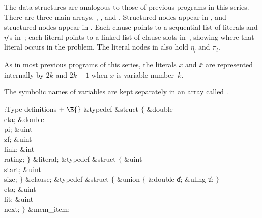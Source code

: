 \fi

The data structures are analogous to those of previous
programs in this
series. There are three main arrays, , , and . Structured
 nodes appear in , and structured 
nodes
appear in . Each clause points to a sequential list of literals
and
$\eta$'s in~; each literal points to a linked list of clause slots
in~, showing where that literal occurs in the problem. The literal
nodes in  also hold $\eta_l$ and $\pi_l$.

As in most previous programs of this series, the literals $x$ and $\bar x$
are represented internally by $2k$ and $2k+1$ when $x$ is variable number~$k$.

The symbolic names of variables are kept separately in an array called .

\Y\B\4:Type definitions\X${}\mathrel+\E{}$\6
\&{typedef} \&{struct} ${}\{{}$\1\6
\&{double} \\{eta};\6
\&{double} \\{pi};\6
\&{uint} \\{zf};\6
\&{uint} \\{link};%
\6
\&{int} \\{rating};%
\2\6
${}\}{}$ \&{literal};\6
\&{typedef} \&{struct} ${}\{{}$\1\6
\&{uint} \\{start};\6
\&{uint} \\{size};\2\6
${}\}{}$ \&{clause};\6
\&{typedef} \&{struct} ${}\{{}$\1\6
\&{union} ${}\{{}$\5
\1\&{double} \|d;\6
\&{ullng} \|u;\2\6
${}\}{}$\5
\\{eta};\6
\&{uint} \\{lit};\6
\&{uint} \\{next};%
\2\6
${}\}{}$ \&{mem\_item};\par
\fi

